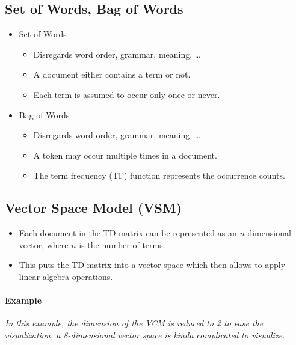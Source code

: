 		\subsection{Set of Words, Bag of Words} %
			\begin{itemize}
				\item Set of Words
					\begin{itemize}
						\item Disregards word order, grammar, meaning, \dots
						\item A document either contains a term or not.
						\item Each term is assumed to occur only once or never.
					\end{itemize}
				\item Bag of Words
					\begin{itemize}
						\item Disregards word order, grammar, meaning, \dots
						\item A token may occur multiple times in a document.
						\item The term frequency (TF) function represents the occurrence counts.
					\end{itemize}
			\end{itemize}

		\subsection{Vector Space Model (VSM)} %
			\begin{itemize}
				\item Each document in the TD-matrix can be represented as an \(n\)-dimensional vector, where \(n\) is the number of terms.
				\item This puts the TD-matrix into a vector space which then allows to apply linear algebra operations.
			\end{itemize}

			\paragraph{Example}
				\textit{In this example, the dimension of the VCM is reduced to 2 to ease the visualization, a 8-dimensional vector space is kinda complicated to visualize.}

